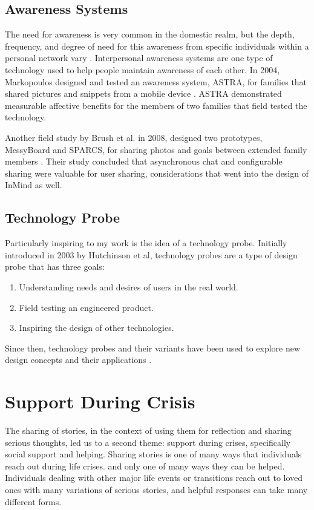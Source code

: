   \subsection{Awareness Systems}
    The need for awareness is very common in the domestic realm,
    but the depth, frequency, and degree of need for this awareness from specific individuals
    within a personal network vary
    \cite{neustaedter06}.
    Interpersonal awareness systems are one type of technology used to
    help people maintain awareness of each other.
    In 2004, Markopoulos designed and tested an
    awareness system, ASTRA, for families that shared pictures and snippets from a mobile
    device
    \cite{markopoulos04}.
    ASTRA demonstrated measurable affective benefits for the members of
    two families that field tested the technology.

    Another field study by Brush et al. in 2008,
    designed two prototypes, MessyBoard and SPARCS,
    for sharing photos and goals between extended family members
    \cite{brush08}.
    Their study concluded that asynchronous chat and configurable sharing were
    valuable for user sharing,
    considerations that went into the design of InMind as well.

  \subsection{Technology Probe}
    Particularly inspiring to my work is the idea of a technology probe.
    Initially introduced in 2003 by Hutchinson et al,
    technology probes are a type of design probe that has three goals:
    \begin{enumerate}
    \item Understanding needs and desires of users in the real world.
    \item Field testing an engineered product.
    \item Inspiring the design of other technologies.
    \end{enumerate}

    Since then, technology probes and their variants have been used to explore
    new design concepts and their applications \cite{vetere05, lottridge09}.

\section{Support During Crisis}
  The sharing of stories,
  in the context of using them for reflection and sharing serious thoughts,
  led us to a second theme:
  support during crises,
  specifically social support and helping.
  Sharing stories is one of many ways that
  individuals reach out during life crises.
  and only one of many ways they can be helped.
  Individuals dealing with other major life events or transitions
  reach out to loved ones with many variations of serious stories,
  and helpful responses can take many different forms.

